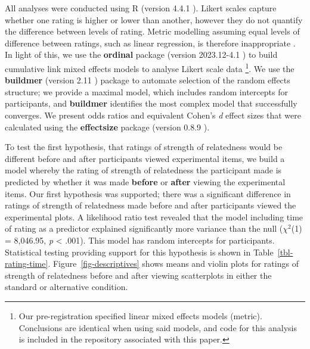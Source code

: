 \documentclass[manuscript,screen,review,anonymous]{acmart}
\begin{document}
All analyses were conducted using R (version 4.4.1 \citep{rcore}).
Likert scales capture whether one rating is higher or lower than
another, however they do not quantify the difference between levels of
rating. Metric modelling assuming equal levels of difference between
ratings, such as linear regression, is therefore inappropriate
\citep{liddell_2018}. In light of this, we use the \textbf{ordinal}
package (version 2023.12-4.1 \citep{ordinal}) to build cumulative link
mixed effects models to analyse Likert scale data \footnote{Our
  pre-registration specified linear mixed effects models (metric).
  Conclusions are identical when using said models, and code for this
  analysis is included in the repository associated with this paper.}.
We use the \textbf{buildmer} (version 2.11 \citep{buildmer}) package to
automate selection of the random effects structure; we provide a maximal
model, which includes random intercepts for participants, and
\textbf{buildmer} identifies the most complex model that successfully
converges. We present odds ratios and equivalent Cohen's \emph{d} effect
sizes that were calculated using the \textbf{effectsize} package
(version 0.8.9 \citep{effectsize}).

To test the first hypothesis, that ratings of strength of relatedness
would be different before and after participants viewed experimental
items, we build a model whereby the rating of strength of relatedness
the participant made is predicted by whether it was made \textbf{before}
or \textbf{after} viewing the experimental items. Our first hypothesis
was supported; there was a significant difference in ratings of strength
of relatedness made before and after participants viewed the
experimental plots. A likelihood ratio test revealed that the model
including time of rating as a predictor explained significantly more
variance than the null (\(\chi^2\)(1) = 8,046.95, \emph{p} \textless{}
.001). This model has random intercepts for participants. Statistical
testing providing support for this hypothesis is shown in
Table~\ref{tbl-rating-time}. Figure~\ref{fig-descriptives} shows means
and violin plots for ratings of strength of relatedness before and after
viewing scatterplots in either the standard or alternative condition.

\begin{table}

\caption{\label{tbl-rating-time}Statistics for the significant main
effect of rating time. Odds ratio and the equivalent Cohen's \textit{d}
value is also supplied.}


\end{table}%
\end{document}
